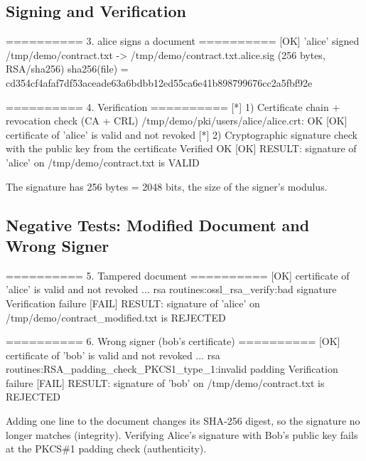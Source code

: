\documentclass[12pt,a4paper]{article}
\begin{document}
\subsection{Signing and Verification}
\begin{terminal}
\begin{termout}
========== 3. alice signs a document ==========
[OK] 'alice' signed /tmp/demo/contract.txt -> /tmp/demo/contract.txt.alice.sig (256 bytes, RSA/sha256)
     sha256(file) = cd354cf4afaf7df53aceade63a6bdbb12ed55ca6e41b898799676cc2a5fbf92e

========== 4. Verification ==========
[*] 1) Certificate chain + revocation check (CA + CRL)
/tmp/demo/pki/users/alice/alice.crt: OK
[OK] certificate of 'alice' is valid and not revoked
[*] 2) Cryptographic signature check with the public key from the certificate
Verified OK
[OK] RESULT: signature of 'alice' on /tmp/demo/contract.txt is VALID
\end{termout}
\end{terminal}
The signature has 256 bytes = 2048 bits, the size of the signer's modulus.

\subsection{Negative Tests: Modified Document and Wrong Signer}
\begin{terminal}
\begin{termout}
========== 5. Tampered document ==========
[OK] certificate of 'alice' is valid and not revoked
... rsa routines:ossl_rsa_verify:bad signature
Verification failure
[FAIL] RESULT: signature of 'alice' on /tmp/demo/contract_modified.txt is REJECTED

========== 6. Wrong signer (bob's certificate) ==========
[OK] certificate of 'bob' is valid and not revoked
... rsa routines:RSA_padding_check_PKCS1_type_1:invalid padding
Verification failure
[FAIL] RESULT: signature of 'bob' on /tmp/demo/contract.txt is REJECTED
\end{termout}
\end{terminal}
Adding one line to the document changes its SHA-256 digest, so the signature no longer matches
(integrity). Verifying Alice's signature with Bob's public key fails at the PKCS\#1 padding check
(authenticity).
\end{document}

